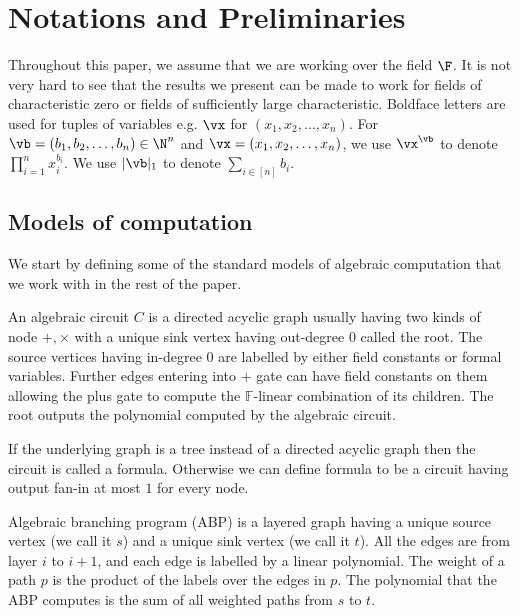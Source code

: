 \section{Notations and Preliminaries}
\label{sec:prelims}
Throughout this paper, we assume that we are working over the field $\F$. It is not very hard to see that the results we present can be made to work for fields of characteristic zero or fields of sufficiently large characteristic. Boldface letters are used for tuples of variables e.g. $\vx$ for $(x_1, x_2, \ldots, x_n)$. For $\vb = (b_1, b_2, \ldots, b_n) \in \N^n$ and $\vx = (x_1, x_2, \ldots, x_n)$, we use  $\vx^{\vb}$ to denote  $\prod_{i = 1}^n x_i^{b_i}$. 
We use $|\vb|_1$ to denote $\sum_{i \in [n]} b_i$. %

\subsection{Models of computation}
We start by defining some of the standard models of algebraic computation that we work with in the rest of the paper. 
\begin{definition}	
	An algebraic circuit $C$ is a directed acyclic graph usually having two kinds of node $+,\times$ with a unique sink vertex having out-degree $0$ called the root. The source vertices having in-degree $0$ are labelled by either field constants or formal variables. Further edges entering into $+$ gate can have field constants on them allowing the plus gate to compute the $\mathbb{F}$-linear combination of its children. The root outputs the polynomial computed by the algebraic circuit. 
\end{definition}

\begin{definition}
	If the underlying graph is a tree instead of a directed acyclic graph then the circuit is called a formula. Otherwise we can define formula to be a circuit having output fan-in at most $1$ for every node.
\end{definition}

\begin{definition}
	Algebraic branching program (ABP) is a layered graph having a unique source vertex (we call it $s$) and a unique sink vertex (we call it $t$). All the edges are from layer $i$ to $i+1$, and each edge is labelled by a linear polynomial. The weight of a path $p$ is the product of the labels over the edges in $p$. The polynomial that the ABP computes is the sum of all weighted paths from $s$ to $t$. 
\end{definition}

